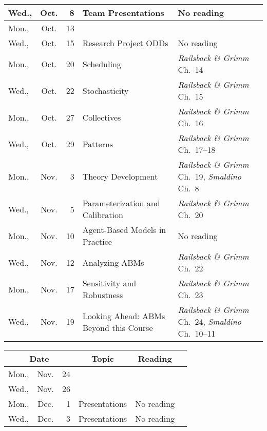 \documentclass[11pt,twoside]{jgsyllabus}\usepackage[]{graphicx}\usepackage[]{xcolor}
\begin{document}
\begin{center}
\begin{tabular}{l@{~}c@{~}r>{\raggedright}m{2.6in}>{\centering}m{2in}c}
   \midrule
Wed., & Oct. &   8 & Team Presentations & No reading &  \\ 
   \midrule
Mon., & Oct. &  13 & \multicolumn{2}{l}{\bfseries\scshape\large Fall Break} & \\%
   \midrule
Wed., & Oct. &  15 & Research Project ODDs & No reading &  \\ 
   \midrule
Mon., & Oct. &  20 & Scheduling & \emph{Railsback \& Grimm\/} Ch.~14 &  \\ 
   \midrule
Wed., & Oct. &  22 & Stochasticity & \emph{Railsback \& Grimm\/} Ch.~15 &  \\ 
   \midrule
Mon., & Oct. &  27 & Collectives & \emph{Railsback \& Grimm\/} Ch.~16 &  \\ 
   \midrule
Wed., & Oct. &  29 & Patterns & \emph{Railsback \& Grimm\/} Ch.~17--18 &  \\ 
   \midrule
Mon., & Nov. &   3 & Theory Development & \emph{Railsback \& Grimm\/} Ch.~19, \emph{Smaldino\/} Ch.~8 &  \\ 
   \midrule
Wed., & Nov. &   5 & Parameterization and Calibration & \emph{Railsback \& Grimm\/} Ch.~20 &  \\ 
   \midrule
Mon., & Nov. &  10 & Agent-Based Models in Practice & No reading &  \\ 
   \midrule
Wed., & Nov. &  12 & Analyzing ABMs & \emph{Railsback \& Grimm\/} Ch.~22 &  \\ 
   \midrule
Mon., & Nov. &  17 & Sensitivity and Robustness & \emph{Railsback \& Grimm\/} Ch.~23 &  \\ 
   \midrule
Wed., & Nov. &  19 & Looking Ahead: ABMs Beyond this Course & \emph{Railsback \& Grimm\/} Ch.~24, \emph{Smaldino\/} Ch.~10--11 &  \\ 
   \bottomrule
\end{tabular}

\end{center}

\begin{center}
\begin{tabular}{l@{~}c@{~}r>{\raggedright}m{2.6in}>{\centering}m{2in}c}
  \toprule
  \multicolumn{3}{c}{\bfseries Date} & \multicolumn{1}{c}{\bfseries Topic} &\multicolumn{1}{c}{\bfseries Reading} &\\
 \midrule
Mon., & Nov. &  24 & \multicolumn{2}{l}{\multirow{3}{*}{\bfseries\scshape\Large Thanksgiving Break}} & \\%
  Wed., & Nov. &  26 &  &  &  \\ 
   \midrule
Mon., & Dec. &   1 & Presentations & No reading &  \\ 
   \midrule
Wed., & Dec. &   3 & Presentations & No reading &  \\ 
   \bottomrule
\end{tabular}

\end{center}
%
\end{document}
